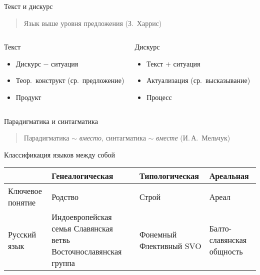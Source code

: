 \begin{frame}{Текст и дискурс}
    \begin{quote}
        Язык выше уровня предложения (З.~Харрис)
    \end{quote}

    \begin{columns}
        \begin{block}{Текст}
            \begin{itemize}
                \item Дискурс $-$ ситуация
                \item Теор.\ конструкт (ср.\ предложение)
                \item Продукт
            \end{itemize}
        \end{block}

        \begin{block}{Дискурс}
            \begin{itemize}
                \item Текст $+$ ситуация
                \item Актуализация (ср.\ высказывание)
                \item Процесс
            \end{itemize}
        \end{block}
    \end{columns}
\end{frame}

\begin{frame}{Парадигматика и синтагматика}
    \begin{quote}
        Парадигматика $\sim$ \textit{вместо}, синтагматика $\sim$ \textit{вместе} (И.\,А.~Мельчук)
    \end{quote}
\end{frame}

\begin{frame}{Классификация языков между собой}
    \begin{table}[t]
        \begin{tabularx}{\textwidth}{p{3cm}XXX}
            & Генеалогическая & Типологическая & Ареальная \\ \midrule \midrule
            Ключевое понятие & Родство & Строй & Ареал \\ \midrule
            Русский язык
                & Индоевропейская семья \linebreak \mbox{Славянская} ветвь \linebreak Восточнославянская группа
                & Фонемный \linebreak Флективный \linebreak SVO
                & Балто-славянская общность \\ \midrule
        \end{tabularx}
    \end{table}
\end{frame}

